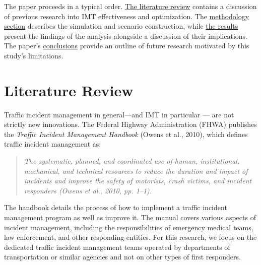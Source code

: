 \documentclass[fancy, oneside, mastersfancy, ms]{byuthesis}
\begin{document}
The paper proceeds in a typical order.
\protect\hyperlink{sec-literature}{The literature review} contains a
discussion of previous research into IMT effectiveness and optimization.
The \protect\hyperlink{sec-methods}{methodology section} describes the
simulation and scenario construction, while
\protect\hyperlink{sec-results}{the results} present the findings of the
analysis alongside a discussion of their implications. The paper's
\protect\hyperlink{sec-conclusions}{conclusions} provide an outline of
future research motivated by this study's limitations.


\hypertarget{sec-literature}{%
\chapter{Literature Review}\label{sec-literature}}

Traffic incident management in general---and IMT in particular --- are
not strictly new innovations. The Federal Highway Administration (FHWA)
publishes the \emph{Traffic Incident Management Handbook} (Owens et al.,
2010), which defines traffic incident management as:

\begin{quote}
\emph{The systematic, planned, and coordinated use of human,
institutional, mechanical, and technical resources to reduce the
duration and impact of incidents and improve the safety of motorists,
crash victims, and incident responders (Owens et al., 2010, pp. 1--1).}
\end{quote}

\noindent The handbook details the process of how to implement a traffic
incident management program as well as improve it. The manual covers
various aspects of incident management, including the responsibilities
of emergency medical teams, law enforcement, and other responding
entities. For this research, we focus on the dedicated traffic incident
management teams operated by departments of transportation or similar
agencies and not on other types of first responders.
\end{document}
